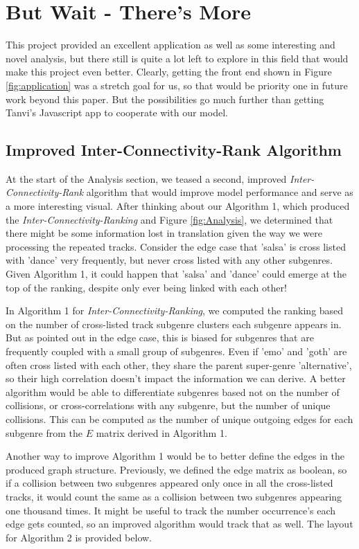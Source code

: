 \documentclass[conference]{IEEEtran}
\begin{document}
\section{But Wait - There's More}
This project provided an excellent application as well as some interesting and novel analysis, but there still is quite a lot left to explore in this field that would make this project even better. Clearly, getting the front end shown in Figure \ref{fig:application} was a stretch goal for us, so that would be priority one in future work beyond this paper. But the possibilities go much further than getting Tanvi's Javascript app to cooperate with our model. 

\subsection{Improved Inter-Connectivity-Rank Algorithm}
At the start of the Analysis section, we teased a second, improved \emph{Inter-Connectivity-Rank} algorithm that would improve model performance and serve as a more interesting visual. After thinking about our Algorithm 1, which produced the \emph{Inter-Connectivity-Ranking} and Figure \ref{fig:Analysis}, we determined that there might be some information lost in translation given the way we were processing the repeated tracks. Consider the edge case that 'salsa' is cross listed with 'dance' very frequently, but never cross listed with any other subgenres. Given Algorithm 1, it could happen that 'salsa' and 'dance' could emerge at the top of the ranking, despite only ever being linked with each other! 

In Algorithm 1 for \emph{Inter-Connectivity-Ranking}, we computed the ranking based on the number of cross-listed track subgenre clusters each subgenre appears in. But as pointed out in the edge case, this is biased for subgenres that are frequently coupled with a small group of subgenres. Even if 'emo' and 'goth' are often cross listed with each other, they share the parent super-genre 'alternative', so their high correlation doesn't impact the information we can derive. A better algorithm would be able to differentiate subgenres based not on the number of collisions, or cross-correlations with any subgenre, but the number of unique collisions. This can be computed as the number of unique outgoing edges for each subgenre from the $E$ matrix derived in Algorithm 1.

Another way to improve Algorithm 1 would be to better define the edges in the produced graph structure. Previously, we defined the edge matrix as boolean, so if a collision between two subgenres appeared only once in all the cross-listed tracks, it would count the same as a collision between two subgenres appearing one thousand times. It might be useful to track the number occurrence's each edge gets counted, so an improved algorithm would track that as well. The layout for Algorithm 2 is provided below.
\end{document}
